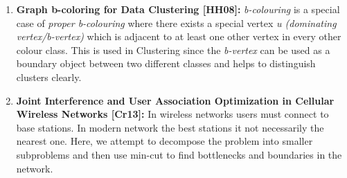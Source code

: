 \begin{enumerate}
        \item{
            \textbf{Graph b-coloring for Data Clustering [HH08]:} \textit{b-colouring} is a special case of \textit{proper b-colouring} where there exists a special vertex \textit{u (dominating vertex/b-vertex)} which is adjacent to at least one other vertex in every other colour class. This is used in Clustering since the \textit{b-vertex} can be used as a boundary object between two different classes and helps to distinguish clusters clearly.
        }

        \item{
            \textbf{Joint Interference and User Association Optimization in Cellular Wireless Networks [Cr13]:} In wireless networks users must connect to base stations. In modern network the best stations it not necessarily the nearest one. Here, we attempt to decompose the problem into smaller subproblems and then use min-cut to find bottlenecks and boundaries in the network.
        }
    \end{enumerate}